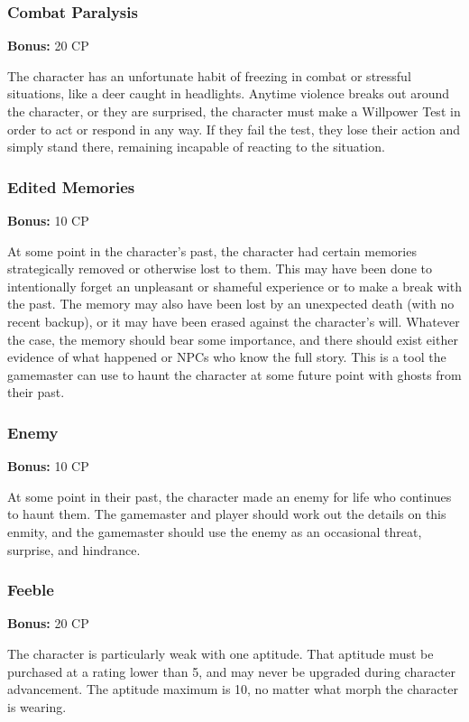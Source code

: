 \subsubsection{Combat Paralysis}
\textbf{Bonus:} 20 CP

The character has an unfortunate habit of freezing in combat or stressful
situations, like a deer caught in headlights. Anytime violence breaks out
around the character, or they are surprised, the character must make a
Willpower Test in order to act or respond in any way. If they fail the test,
they lose their action and simply stand there, remaining incapable of reacting
to the situation.

\subsubsection{Edited Memories}
\textbf{Bonus:} 10 CP

At some point in the character’s past, the character had certain memories
strategically removed or otherwise lost to them. This may have been done to
intentionally forget an unpleasant or shameful experience or to make a break
with the past. The memory may also have been lost by an unexpected death (with
no recent backup), or it may have been erased against the character’s
will. Whatever the case, the memory should bear some importance, and there
should exist either evidence of what happened or NPCs who know the full
story. This is a tool the gamemaster can use to haunt the character at some
future point with ghosts from their past.

\subsubsection{Enemy}
\textbf{Bonus:} 10 CP

At some point in their past, the character made an enemy for life who continues
to haunt them. The gamemaster and player should work out the details on this
enmity, and the gamemaster should use the enemy as an occasional threat,
surprise, and hindrance.

\subsubsection{Feeble}
\textbf{Bonus:} 20 CP

The character is particularly weak with one aptitude.  That aptitude must be
purchased at a rating lower than 5, and may never be upgraded during character
advancement. The aptitude maximum is 10, no matter what morph the character is
wearing.

